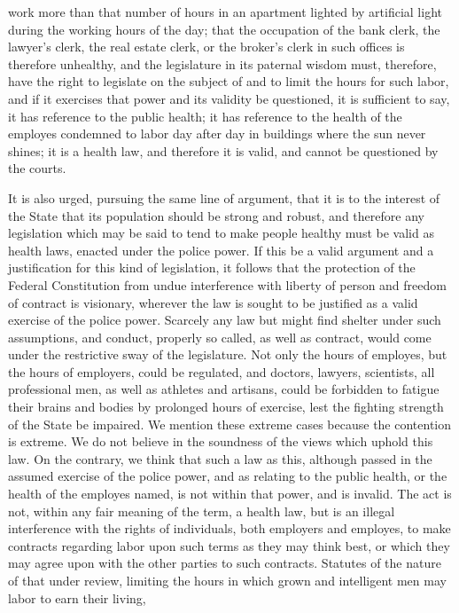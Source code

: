 \documentclass[
  letterpaper,
  11pt,
  DIV=9,
  openright]{scrbook}
\begin{document}
work more than that number of hours in an apartment lighted by
artificial light during the working hours of the day; that the
occupation of the bank clerk, the lawyer's clerk, the real estate clerk,
or the broker's clerk in such offices is therefore unhealthy, and the
legislature in its paternal wisdom must, therefore, have the right to
legislate on the subject of and to limit the hours for such labor, and
if it exercises that power and its validity be questioned, it is
sufficient to say, it has reference to the public health; it has
reference to the health of the employes condemned to labor day after day
in buildings where the sun never shines; it is a health law, and
therefore it is valid, and cannot be questioned by the courts.

It is also urged, pursuing the same line of argument, that it is to the
interest of the State that its population should be strong and robust,
and therefore any legislation which may be said to tend to make people
healthy must be valid as health laws, enacted under the police power. If
this be a valid argument and a justification for this kind of
legislation, it follows that the protection of the Federal Constitution
from undue interference with liberty of person and freedom of contract
is visionary, wherever the law is sought to be justified as a valid
exercise of the police power. Scarcely any law but might find shelter
under such assumptions, and conduct, properly so called, as well as
contract, would come under the restrictive sway of the legislature. Not
only the hours of employes, but the hours of employers, could be
regulated, and doctors, lawyers, scientists, all professional men, as
well as athletes and artisans, could be forbidden to fatigue their
brains and bodies by prolonged hours of exercise, lest the fighting
strength of the State be impaired. We mention these extreme cases
because the contention is extreme. We do not believe in the soundness of
the views which uphold this law. On the contrary, we think that such a
law as this, although passed in the assumed exercise of the police
power, and as relating to the public health, or the health of the
employes named, is not within that power, and is invalid. The act is
not, within any fair meaning of the term, a health law, but is an
illegal interference with the rights of individuals, both employers and
employes, to make contracts regarding labor upon such terms as they may
think best, or which they may agree upon with the other parties to such
contracts. Statutes of the nature of that under review, limiting the
hours in which grown and intelligent men may labor to earn their living,
\end{document}
